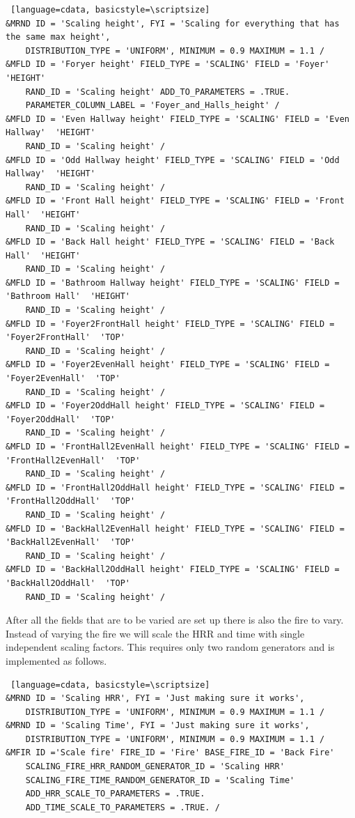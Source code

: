 \documentclass[12pt,twoside]{book}
\begin{document}
\vspace{\baselineskip}
\begin{lstlisting} [language=cdata, basicstyle=\scriptsize]
&MRND ID = 'Scaling height', FYI = 'Scaling for everything that has the same max height',
	DISTRIBUTION_TYPE = 'UNIFORM', MINIMUM = 0.9 MAXIMUM = 1.1 /
&MFLD ID = 'Foryer height' FIELD_TYPE = 'SCALING' FIELD = 'Foyer'  'HEIGHT'
    RAND_ID = 'Scaling height' ADD_TO_PARAMETERS = .TRUE.
    PARAMETER_COLUMN_LABEL = 'Foyer_and_Halls_height' /
&MFLD ID = 'Even Hallway height' FIELD_TYPE = 'SCALING' FIELD = 'Even Hallway'  'HEIGHT'
	RAND_ID = 'Scaling height' /
&MFLD ID = 'Odd Hallway height' FIELD_TYPE = 'SCALING' FIELD = 'Odd Hallway'  'HEIGHT'
	RAND_ID = 'Scaling height' /
&MFLD ID = 'Front Hall height' FIELD_TYPE = 'SCALING' FIELD = 'Front Hall'  'HEIGHT'
	RAND_ID = 'Scaling height' /
&MFLD ID = 'Back Hall height' FIELD_TYPE = 'SCALING' FIELD = 'Back Hall'  'HEIGHT'
	RAND_ID = 'Scaling height' /
&MFLD ID = 'Bathroom Hallway height' FIELD_TYPE = 'SCALING' FIELD = 'Bathroom Hall'  'HEIGHT'
	RAND_ID = 'Scaling height' /
&MFLD ID = 'Foyer2FrontHall height' FIELD_TYPE = 'SCALING' FIELD = 'Foyer2FrontHall'  'TOP'
	RAND_ID = 'Scaling height' /
&MFLD ID = 'Foyer2EvenHall height' FIELD_TYPE = 'SCALING' FIELD = 'Foyer2EvenHall'  'TOP'
	RAND_ID = 'Scaling height' /
&MFLD ID = 'Foyer2OddHall height' FIELD_TYPE = 'SCALING' FIELD = 'Foyer2OddHall'  'TOP'
	RAND_ID = 'Scaling height' /
&MFLD ID = 'FrontHall2EvenHall height' FIELD_TYPE = 'SCALING' FIELD = 'FrontHall2EvenHall'  'TOP'
	RAND_ID = 'Scaling height' /
&MFLD ID = 'FrontHall2OddHall height' FIELD_TYPE = 'SCALING' FIELD = 'FrontHall2OddHall'  'TOP'
	RAND_ID = 'Scaling height' /
&MFLD ID = 'BackHall2EvenHall height' FIELD_TYPE = 'SCALING' FIELD = 'BackHall2EvenHall'  'TOP'
	RAND_ID = 'Scaling height' /
&MFLD ID = 'BackHall2OddHall height' FIELD_TYPE = 'SCALING' FIELD = 'BackHall2OddHall'  'TOP'
	RAND_ID = 'Scaling height' /
\end{lstlisting}

After all the fields that are to be varied are set up there is also the fire to vary. Instead of varying the fire we will scale the HRR and time with single independent scaling factors. This requires only two random generators and is implemented as follows.

\vspace{\baselineskip}
\begin{lstlisting} [language=cdata, basicstyle=\scriptsize]
&MRND ID = 'Scaling HRR', FYI = 'Just making sure it works',
	DISTRIBUTION_TYPE = 'UNIFORM', MINIMUM = 0.9 MAXIMUM = 1.1 /
&MRND ID = 'Scaling Time', FYI = 'Just making sure it works',
	DISTRIBUTION_TYPE = 'UNIFORM', MINIMUM = 0.9 MAXIMUM = 1.1 /
&MFIR ID ='Scale fire' FIRE_ID = 'Fire' BASE_FIRE_ID = 'Back Fire'
	SCALING_FIRE_HRR_RANDOM_GENERATOR_ID = 'Scaling HRR'
    SCALING_FIRE_TIME_RANDOM_GENERATOR_ID = 'Scaling Time'
    ADD_HRR_SCALE_TO_PARAMETERS = .TRUE.
    ADD_TIME_SCALE_TO_PARAMETERS = .TRUE. /
\end{lstlisting}
\end{document}
